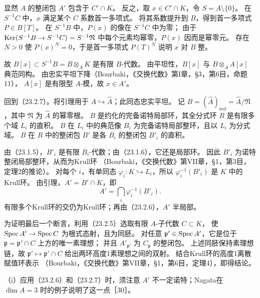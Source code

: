 显然 $A$ 的整闭包 $A'$ 包含于 $C'\cap K$。
反之，取 $x\in C'\cap K$，令 $S=A\setminus\{0\}$。
在 $S^{-1}C$ 中，$x$ 满足某个 $C$ 系数首一多项式。
将其系数提升到 $B$，得到首一多项式 $P\in B[T]$。
在 $S^{-1}B$ 中，$P(x)$ 的像在 $S^{-1}C$ 中为零；
由于 $\operatorname{Ker}(S^{-1}B\to S^{-1}C)=S^{-1}\mathfrak N$ 中每个元素均幂零，$P(x)$ 因而是幂零元。
存在 $N>0$ 使 $P(x)^N=0$，于是首一多项式 $P(T)^N$ 说明 $x$ 对 $B$ 整。

故 $B[x]\subset S^{-1}B=B\otimes_AK$ 是有限 $B$-代数。
由平坦性，$B[x]$ 与 $B\otimes_AA[x]$ 典范同构。
由忠实平坦下降（Bourbaki，《交换代数》第I章，\S3，第6目，命题11），
$A[x]$ 是有限型 $A$-模，故 $x\in A'$。
\finishproof

\eproof
回到（23.2.7）。将引理用于 $A\hookrightarrow\widehat A$；此同态忠实平坦。
记 $B=(\widehat A)_{\mathrm{red}}=\widehat A/\mathfrak N$，其中 $\mathfrak N$ 为 $\widehat A$ 的幂零根。
$B$ 是约化的完备诺特局部环，其全分式环 $R$ 是有限多个域 $L_i$ 的直积。
$B$ 在 $L_i$ 中的典范像 $B_i$ 为完备诺特局部整环，且以 $L_i$ 为分式域。
$B$ 在 $R$ 中的整闭包 $B'$ 是各 $B_i$ 的整闭包 $B'_i$ 的直积。

由（23.1.5），$B'_i$ 是有限 $B_i$-代数；由（23.1.6），它还是局部环。
因此 $B'_i$ 为诺特整闭局部整环，从而为Krull环
（Bourbaki，《交换代数》第VII章，\S1，第3目，定理2的推论）。
对每个 $i$，有单同态 $\varphi_i:K\hookrightarrow L_i$，所以
$\varphi_i^{-1}(B'_i)$ 是 $K$ 中的Krull环。
由引理，$A'=B'\cap K$，即
\[
 A'=\bigcap_i\varphi_i^{-1}(B'_i).
\]
有限多个Krull环的交仍为Krull环；再由（23.2.6），$A'$ 半局部。

为证明最后一个断言，利用（23.2.5）选取有限 $A$-子代数 $C\subset K$，
使 $\operatorname{Spec} A'\to\operatorname{Spec} C$ 为根式态射，且为同胚。
对任意 $\mathfrak p'\in\operatorname{Spec} A'$，它是位于 $\mathfrak p=\mathfrak p'\cap C$ 上方的唯一素理想；
并且 $A'_{\mathfrak p'}$ 为 $C_{\mathfrak p}$ 的整闭包。
上述同胚保持素理想链，故 $\mathfrak p'\mapsto\mathfrak p'\cap C$
给出两环高度1素理想之间的双射。
结合Krull环的高度1离散赋值环表示
（Bourbaki，《交换代数》第VII章，\S1，第6目，定理4），即得结论。
\finishproof

（i）应用（23.2.6）和（23.2.7）时，须注意 $A'$ 不一定诺特；Nagata在 $\dim A=3$ 时的例子说明了这一点［30］。

